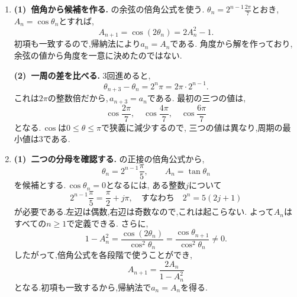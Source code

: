 \begin{enumerate}[label=\textbf{問\arabic*.},leftmargin=3.8em,format=\bookitemlink{practice-special}{solution}{problem}]
                \smallskip
                \textbf{(2)~指数を3倍する.}
                $\displaystyle a_1=2+2^{-1}$に合う候補を
                \[
                  A_n=2^{\,3^{n-1}}+2^{-3^{n-1}}
                \]
                とする.(1)に$\displaystyle u=2^{\,3^{n-1}}$を代入すると,
                \[
                  A_{n+1}=A_n^3-3A_n
                \]
                となる.初項とが一致するので,帰納法より$\displaystyle a_n=A_n$である.
                $\displaystyle -3a_n$の項が交差項を正確に打ち消すため,同じ対称式の形を保って次へ進める.
          \item \textbf{(1)~倍角から候補を作る.}
                の余弦の倍角公式を使う.
                $\displaystyle \theta_n=2^{n-1}\frac{2\pi}{7}$とおき,
                $\displaystyle A_n=\cos\theta_n$とすれば,
                \[
                  A_{n+1}=\cos(2\theta_n)=2A_n^2-1.
                \]
                初項も一致するので,帰納法により$\displaystyle a_n=A_n$である.
                角度から解を作っており,余弦の値から角度を一意に決めたのではない.

                \smallskip
                \textbf{(2)~一周の差を比べる.}
                3回進めると,
                \[
                  \theta_{n+3}-\theta_n=2^n\pi
                      =2\pi\cdot2^{n-1}.
                \]
                これは$\displaystyle 2\pi$の整数倍だから,\,$\displaystyle a_{n+3}=a_n$である.
                最初の三つの値は,
                \[
                  \cos\frac{2\pi}{7},\quad
                  \cos\frac{4\pi}{7},\quad
                  \cos\frac{6\pi}{7}
                \]
                となる.\,$\displaystyle \cos$は$\displaystyle 0\le\theta\le\pi$で狭義に減少するので,
                三つの値は異なり,周期の最小値は$\displaystyle 3$である.
          \item \textbf{(1)~二つの分母を確認する.}
                の正接の倍角公式から,
                \[
                  \theta_n=2^{n-1}\frac\pi5,\qquad A_n=\tan\theta_n
                \]
                を候補とする.\,$\displaystyle \cos\theta_n=0$となるには,
                ある整数$\displaystyle j$について
                \[
                  2^{n-1}\frac\pi5=\frac\pi2+j\pi,
                  \quad\text{すなわち}\quad 2^n=5(2j+1)
                \]
                が必要である.左辺は偶数,右辺は奇数なので,これは起こらない.
                よって$\displaystyle A_n$はすべての$\displaystyle n\ge1$で定義できる.
                さらに,
                \[
                  1-A_n^2=\frac{\cos(2\theta_n)}{\cos^2\theta_n}
                           =\frac{\cos\theta_{n+1}}{\cos^2\theta_n}\ne0.
                \]
                したがって,倍角公式を各段階で使うことができ,
                \[
                  A_{n+1}=\frac{2A_n}{1-A_n^2}
                \]
                となる.初項も一致するから,帰納法で$\displaystyle a_n=A_n$を得る.


\end{enumerate}
